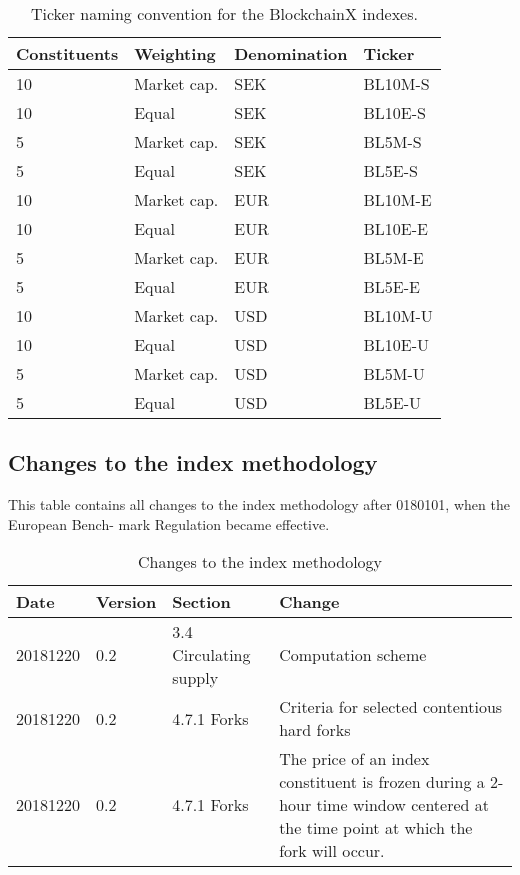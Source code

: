 \documentclass{article}
\begin{document}
\begin{table}[H]
\caption{Ticker naming convention for the BlockchainX indexes.}
\label{ticker-table}
\begin{tabular}{@{}llll@{}}
\toprule
\textbf{Constituents} & \textbf{Weighting} & \textbf{Denomination} & \textbf{Ticker} \\ \midrule
10                    & Market cap.        & SEK                   & BL10M-S         \\
10                    & Equal              & SEK                   & BL10E-S         \\
5                     & Market cap.        & SEK                   & BL5M-S          \\
5                     & Equal              & SEK                   & BL5E-S          \\
10                    & Market cap.        & EUR                   & BL10M-E         \\
10                    & Equal              & EUR                   & BL10E-E         \\
5                     & Market cap.        & EUR                   & BL5M-E          \\
5                     & Equal              & EUR                   & BL5E-E          \\
10                    & Market cap.        & USD                   & BL10M-U         \\
10                    & Equal              & USD                   & BL10E-U         \\
5                     & Market cap.        & USD                   & BL5M-U          \\
5                     & Equal              & USD                   & BL5E-U          \\
\bottomrule
\end{tabular}
\end{table}

\subsection{Changes to the index methodology}
This table contains all changes to the index methodology after 0180101, when the European Bench- mark Regulation became effective.
\begin{table}[H]
\caption{Changes to the index methodology}
\label{changes-table}
\begin{tabular}{@{}llll@{}}
\toprule
\textbf{Date} & \textbf{Version} & \textbf{Section} & \textbf{Change} \\ \midrule
20181220                   & 0.2      & 3.4 Circulating supply                 & Computation scheme      \\
20181220                     & 0.2              & 4.7.1 Forks                & Criteria for selected contentious hard forks        \\
20181220                     & 0.2       & 4.7.1 Forks                 &  \multicolumn{1}{p{6cm}}{The price of an index constituent is frozen during a 2-hour time window centered at the time point at which the fork will occur.}
\bottomrule
\end{tabular}
\end{table}
\end{document}
